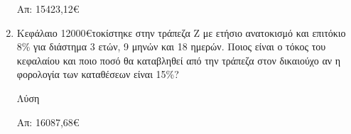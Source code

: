 \documentclass[a4paper,12pt]{article}
\begin{document}
\begin{enumerate}
\vspace{3cm}\hfill Απ: 15423,12\euro

\item Κεφάλαιο 12000\euro τοκίστηκε στην τράπεζα Ζ με ετήσιο ανατοκισμό και επιτόκιο 8\% για διάστημα 3 ετών, 9 μηνών και 18 ημερών. Ποιος είναι ο τόκος του κεφαλαίου και ποιο ποσό θα καταβληθεί από την τράπεζα στον δικαιούχο αν η φορολογία των καταθέσεων είναι 15\%?

\hspace{.15\textwidth}Λύση

\vspace{4cm}\hfill Απ: 16087,68\euro



\end{enumerate}
\end{document}
